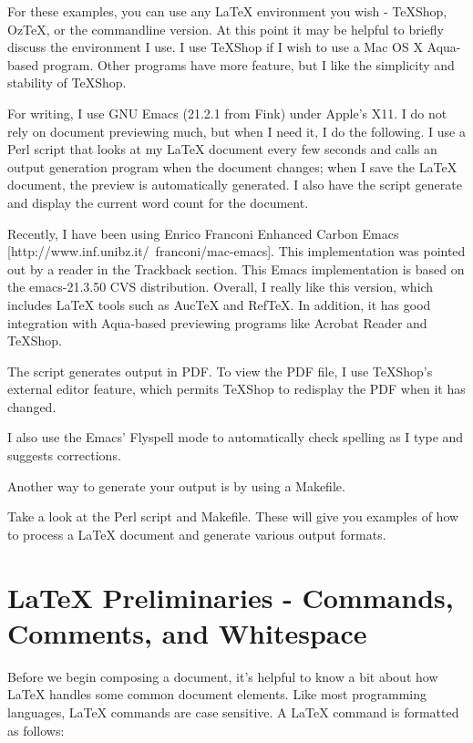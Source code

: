 \documentclass{article}
\begin{document}
For these examples, you can use any LaTeX environment you wish -
TeXShop, OzTeX, or the commandline version. At this point it may be
helpful to briefly discuss the environment I use. I use TeXShop if I
wish to use a Mac OS X Aqua-based program. Other programs have more
feature, but I like the simplicity and stability of TeXShop.

For writing, I use GNU Emacs (21.2.1 from Fink) under Apple's X11. I
do not rely on document previewing much, but when I need it, I do the
following. I use a Perl script that looks at my LaTeX document every
few seconds and calls an output generation program when the document
changes; when I save the LaTeX document, the preview is automatically
generated. I also have the script generate and display the current
word count for the document.

Recently, I have been using Enrico Franconi Enhanced Carbon Emacs
[http://www.inf.unibz.it/~franconi/mac-emacs]. This implementation was
pointed out by a reader in the Trackback section. This Emacs
implementation is based on the emacs-21.3.50 CVS distribution.
Overall, I really like this version, which includes LaTeX tools such
as AucTeX and RefTeX. In addition, it has good integration with
Aqua-based previewing programs like Acrobat Reader and TeXShop.


The script generates output in PDF. To view the PDF file, I use
TeXShop's external editor feature, which permits TeXShop to redisplay
the PDF when it has changed.

I also use the Emacs' Flyspell mode to automatically check spelling as
I type and suggests corrections.

Another way to generate your output is by using a Makefile.

Take a look at the Perl script and Makefile. These will give you
examples of how to process a LaTeX document and generate various
output formats.

\section{LaTeX Preliminaries - Commands, Comments, and Whitespace}
Before we begin composing a document, it's helpful to know a bit about how LaTeX handles some common
document elements. Like most programming languages, LaTeX commands are case sensitive. A LaTeX
command is formatted as follows:
\end{document}
